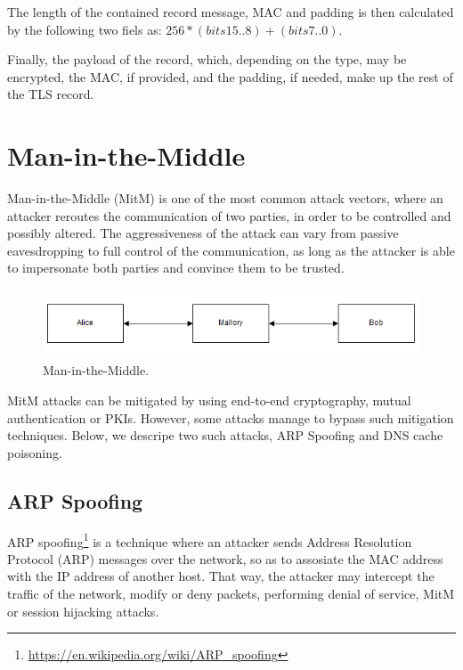 The length of the contained record message, MAC and padding is then calculated
by the following two fiels as: \begin{math}256*(bits 15..8) + (bits
7..0)\end{math}.

Finally, the payload of the record, which, depending on the type, may be
encrypted, the MAC, if provided, and the padding, if needed, make up the rest of
the TLS record.

\section{Man-in-the-Middle}\label{sec:mitm}

Man-in-the-Middle (MitM) is one of the most common attack vectors, where an
attacker reroutes the communication of two parties, in order to be controlled
and possibly altered. The aggressiveness of the attack can vary from passive
eavesdropping to full control of the communication, as long as the attacker is
able to impersonate both parties and convince them to be trusted.

\begin{figure}[H] \caption{Man-in-the-Middle.} \centering
\includegraphics[width=1\textwidth]{diagrams/mitm.png}\end{figure}

MitM attacks can be mitigated by using end-to-end cryptography, mutual
authentication or PKIs. However, some attacks manage to bypass such mitigation
techniques. Below, we descripe two such attacks, ARP Spoofing and DNS cache
poisoning.

\subsection{ARP Spoofing}

ARP spoofing\footnote{\url{https://en.wikipedia.org/wiki/ARP_spoofing}} is a
technique where an attacker sends Address Resolution Protocol (ARP) messages
over the network, so as to assosiate the MAC address with the IP address of
another host. That way, the attacker may intercept the traffic of the network,
modify or deny packets, performing denial of service, MitM or session hijacking
attacks.

